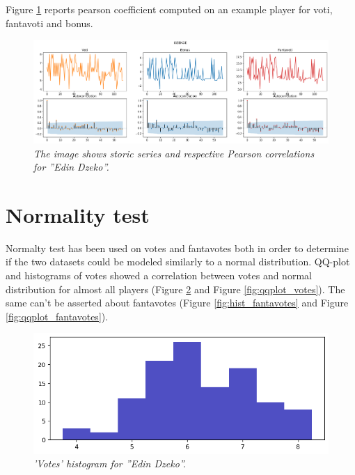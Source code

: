 Figure \ref{fig:playereg} reports pearson coefficient computed on an example player for voti, fantavoti and bonus.

\begin{figure}[H]
  \includegraphics[width=\textwidth]{images/dzeko_all_infos.png}
   \caption{\textit{The image shows storic series and respective Pearson correlations for ''Edin Dzeko''.}}
  \label{fig:playereg}
\end{figure}

\section{Normality test}
Normalty test has been used on votes and fantavotes both in order to determine if the two datasets could be modeled similarly to a normal distribution.
QQ-plot and histograms of votes showed a correlation between votes and normal distribution for almost all players (Figure \ref{fig:hist_votes} and Figure \ref{fig:qqplot_votes}).
The same can't be asserted about fantavotes (Figure \ref{fig:hist_fantavotes} and Figure \ref{fig:qqplot_fantavotes}).

\begin{figure}[H]
  \includegraphics[scale=0.5]{images/dzeko_normality_test_voti_barchart.png}
    \centering  
   \caption{\textit{'Votes' histogram for ''Edin Dzeko''.}}
  \label{fig:hist_votes}
\end{figure}

